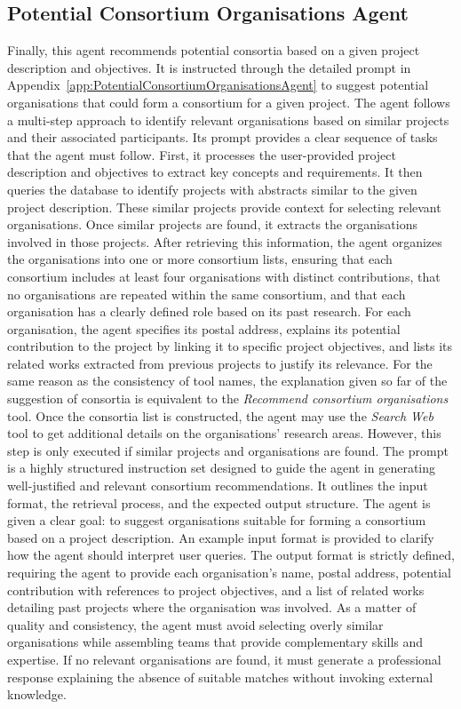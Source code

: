\subsection*{Potential Consortium Organisations Agent}
Finally, this agent recommends potential consortia based on a given project description and objectives.
It is instructed through the detailed prompt in Appendix~\ref{app:PotentialConsortiumOrganisationsAgent} to suggest potential organisations that could form a consortium for a given project.
The agent follows a multi-step approach to identify relevant organisations based on similar projects and their associated participants.
Its prompt provides a clear sequence of tasks that the agent must follow.
First, it processes the user-provided project description and objectives to extract key concepts and requirements.
It then queries the database to identify projects with abstracts similar to the given project description.
These similar projects provide context for selecting relevant organisations.
Once similar projects are found, it extracts the organisations involved in those projects.
After retrieving this information, the agent organizes the organisations into one or more consortium lists, ensuring that each consortium includes at least four organisations with distinct contributions, that no organisations are repeated within the same consortium, and that each organisation has a clearly defined role based on its past research.
For each organisation, the agent specifies its postal address, explains its potential contribution to the project by linking it to specific project objectives, and lists its related works extracted from previous projects to justify its relevance.
For the same reason as the consistency of tool names, the explanation given so far of the suggestion of consortia is equivalent to the \textit{Recommend consortium organisations} tool.
Once the consortia list is constructed, the agent may use the \textit{Search Web} tool to get additional details on the organisations' research areas.
However, this step is only executed if similar projects and organisations are found.
The prompt is a highly structured instruction set designed to guide the agent in generating well-justified and relevant consortium recommendations.
It outlines the input format, the retrieval process, and the expected output structure.
The agent is given a clear goal: to suggest organisations suitable for forming a consortium based on a project description.
An example input format is provided to clarify how the agent should interpret user queries.
The output format is strictly defined, requiring the agent to provide each organisation's name, postal address, potential contribution with references to project objectives, and a list of related works detailing past projects where the organisation was involved.
As a matter of quality and consistency, the agent must avoid selecting overly similar organisations while assembling teams that provide complementary skills and expertise.
If no relevant organisations are found, it must generate a professional response explaining the absence of suitable matches without invoking external knowledge.

